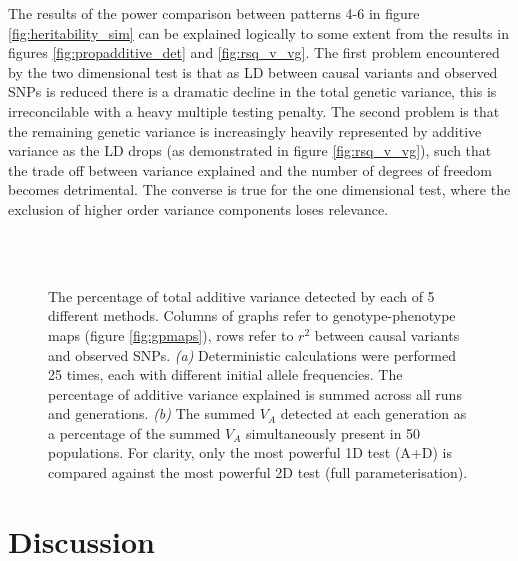 The results of the power comparison between patterns 4-6 in figure \ref{fig:heritability_sim} can be explained logically to some extent from the results in figures \ref{fig:propadditive_det} and \ref{fig:rsq_v_vg}. The first problem encountered by the two dimensional test is that as LD between causal variants and observed SNPs is reduced there is a dramatic decline in the total genetic variance, this is irreconcilable with a heavy multiple testing penalty. The second problem is that the remaining genetic variance is increasingly heavily represented by additive variance as the LD drops (as demonstrated in figure \ref{fig:rsq_v_vg}), such that the trade off between variance explained and the number of degrees of freedom becomes detrimental. The converse is true for the one dimensional test, where the exclusion of higher order variance components loses relevance.


\begin{figure}
\begin{center}
 \\
 \\
\caption[Proportion of additive variance detected]{The percentage of total additive variance detected by each of 5 different methods. Columns of graphs refer to genotype-phenotype maps (figure \ref{fig:gpmaps}), rows refer to $r^{2}$ between causal variants and observed SNPs. \emph{(a)} Deterministic calculations were performed 25 times, each with different initial allele frequencies. The percentage of additive variance explained is summed across all runs and generations. \emph{(b)} The summed $V_A$ detected at each generation as a percentage of the summed $V_A$ simultaneously present in 50 populations. For clarity, only the most powerful 1D test (A+D) is compared against the most powerful 2D test (full parameterisation).}
\label{fig:heritability}
\end{center}
\end{figure}

\section{Discussion}

